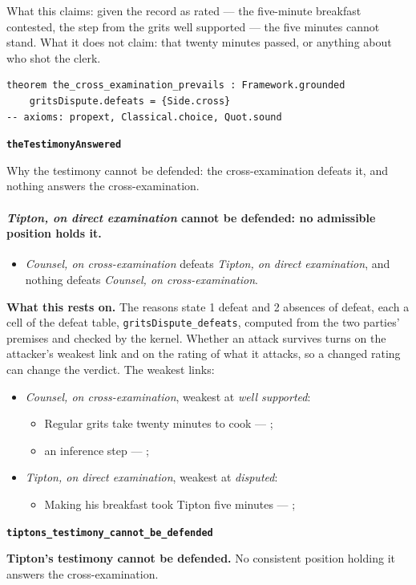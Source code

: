 \documentclass[11pt]{article}
\begin{document}
What this claims: given the record as rated — the five-minute breakfast contested, the step from the grits well supported — the five minutes cannot stand. What it does not claim: that twenty minutes passed, or anything about who shot the clerk.

{\small\begin{verbatim}
theorem the_cross_examination_prevails : Framework.grounded
    gritsDispute.defeats = {Side.cross}
-- axioms: propext, Classical.choice, Quot.sound
\end{verbatim}}
\par\medskip\noindent\textbf{\texttt{the\allowbreak{}Testimony\allowbreak{}Answered}}\par\nobreak\noindent
Why the testimony cannot be defended: the cross-examination defeats it, and nothing answers the cross-examination.

\paragraph{\emph{Tipton, on direct examination} cannot be defended: no admissible position holds it.}
\begin{itemize}
\item \emph{Counsel, on cross-examination} defeats \emph{Tipton, on direct examination}, and nothing defeats \emph{Counsel, on cross-examination}.
\end{itemize}
\par\noindent\textbf{What this rests on.} The reasons state 1 defeat and 2 absences of defeat, each a cell of the defeat table, \texttt{grits\allowbreak{}Dispute\_\allowbreak{}defeats}, computed from the two parties' premises and checked by the kernel. Whether an attack survives turns on the attacker's weakest link and on the rating of what it attacks, so a changed rating can change the verdict. The weakest links:
\begin{itemize}
\item \emph{Counsel, on cross-examination}, weakest at \emph{well supported}:
\begin{itemize}
\item Regular grits take twenty minutes to cook --- \cite[11--12]{garland-novato-healthcare-2019}; \cite{launer-my-cousin-vinny-1992}
\item an inference step --- \cite[11--12]{garland-novato-healthcare-2019}; \cite{launer-my-cousin-vinny-1992}
\end{itemize}
\item \emph{Tipton, on direct examination}, weakest at \emph{disputed}:
\begin{itemize}
\item Making his breakfast took Tipton five minutes --- \cite[11--12]{garland-novato-healthcare-2019}; \cite{launer-my-cousin-vinny-1992}
\end{itemize}
\end{itemize}
\par\medskip\noindent\textbf{\texttt{tiptons\_\allowbreak{}testimony\_\allowbreak{}cannot\_\allowbreak{}be\_\allowbreak{}defended}}\par\nobreak\noindent
\textbf{Tipton’s testimony cannot be defended.} No consistent position holding it answers the cross-examination.
\end{document}
